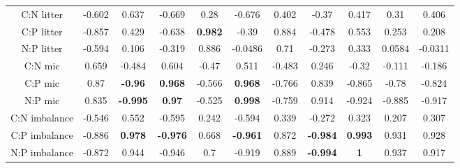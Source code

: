 \documentclass[authoryear,preprint,review,12pt]{elsarticle}
\begin{document}
\begin{table}[h!]
\begin{center}
{\begin{tabular}{ccccccccccc}
  C:N litter & -0.602 & 0.637 & -0.669 & 0.28 & -0.676 & 0.402 & -0.37 & 0.417 & 0.31 & 0.406 \\ 
  C:P litter & -0.857 & 0.429 & -0.638 & \textbf{ 0.982 } & -0.39 & 0.884 & -0.478 & 0.553 & 0.253 & 0.208 \\ 
  N:P litter & -0.594 & 0.106 & -0.319 & 0.886 & -0.0486 & 0.71 & -0.273 & 0.333 & 0.0584 & -0.0311 \\ 
  C:N mic & 0.659 & -0.484 & 0.604 & -0.47 & 0.511 & -0.483 & 0.246 & -0.32 & -0.111 & -0.186 \\ 
  C:P mic & 0.87 & \textbf{ -0.96 } & \textbf{ 0.968 } & -0.566 & \textbf{ 0.968 } & -0.766 & 0.839 & -0.865 & -0.78 & -0.824 \\ 
  N:P mic & 0.835 & \textbf{ -0.995 } & \textbf{ 0.97 } & -0.525 & \textbf{ 0.998 } & -0.759 & 0.914 & -0.924 & -0.885 & -0.917 \\ 
  C:N imbalance & -0.546 & 0.552 & -0.595 & 0.242 & -0.594 & 0.339 & -0.272 & 0.323 & 0.207 & 0.307 \\ 
  C:P imbalance & -0.886 & \textbf{ 0.978 } & \textbf{ -0.976 } & 0.668 & \textbf{ -0.961 } & 0.872 & \textbf{ -0.984 } & \textbf{ 0.993 } & 0.931 & 0.928 \\ 
  N:P imbalance & -0.872 & 0.944 & -0.946 &  0.7 & -0.919 & 0.889 & \textbf{ -0.994 } & \textbf{    1 } & 0.937 & 0.917 \\ 
   \hline
\end{tabular}
}
\end{center}
\end{table}
\end{document}
